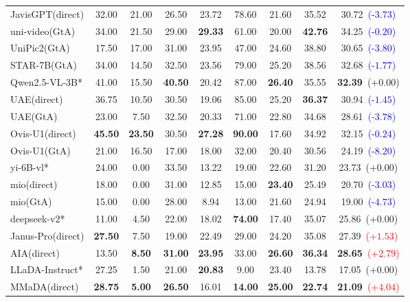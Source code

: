 \documentclass{article}
\theoremstyle{plain}
\theoremstyle{definition}
\theoremstyle{remark}
\begin{document}
\begin{table}[t]
{\begin{tabular}{@{}lcccccccc@{}}
JavisGPT(direct) & 32.00 & 21.00 & 26.50 & 23.72 & 78.60 & 21.60 & 35.52 & 30.72~\textcolor{blue}{(-$3.73$)} \\
uni-video(GtA) & 34.00 & 21.50 & 29.00 & \textbf{29.33} & 61.00 & 20.00 & \textbf{42.76} & 34.25~\textcolor{blue}{(-$0.20$)} \\
UniPic2(GtA) & 17.50 & 17.00 & 31.00 & 23.95 & 47.00 & 24.60 & 38.80 & 30.65~\textcolor{blue}{(-$3.80$)} \\
STAR-7B(GtA) & 34.00 & 14.50 & 32.50 & 23.56 & 79.00 & 25.20 & 38.56 & 32.68~\textcolor{blue}{(-$1.77$)} \\
\midrule
\rowcolor{gray!12}
Qwen2.5-VL-3B* & 41.00 & 15.50 & \textbf{40.50} & 20.42 & 87.00 & \textbf{26.40} & 35.55 & \textbf{32.39}~(+$0.00$) \\
UAE(direct) & 36.75 & 10.50 & 30.50 & 19.06 & 85.00 & 25.20 & \textbf{36.37} & 30.94~\textcolor{blue}{(-$1.45$)} \\
UAE(GtA) & 23.00 & 7.50 & 32.50 & 20.33 & 71.00 & 22.80 & 34.68 & 28.61~\textcolor{blue}{(-$3.78$)} \\
Ovis-U1(direct) & \textbf{45.50} & \textbf{23.50} & 30.50 & \textbf{27.28} & \textbf{90.00} & 17.60 & 34.92 & 32.15~\textcolor{blue}{(-$0.24$)} \\
Ovis-U1(GtA) & 21.00 & 16.50 & 17.00 & 18.00 & 32.00 & 20.40 & 30.56 & 24.19~\textcolor{blue}{(-$8.20$)} \\
\midrule
\rowcolor{gray!12}
yi-6B-vl* & 24.00 & 0.00 & 33.50 & 13.22 & 19.00 & 22.60 & 31.20 & 23.73~(+$0.00$) \\
mio(direct) & 18.00 & 0.00 & 31.00 & 12.85 & 15.00 & \textbf{23.40} & 25.49 & 20.70~\textcolor{blue}{(-$3.03$)} \\
mio(GtA) & 15.00 & 0.00 & 28.00 & 8.94 & 13.00 & 21.60 & 24.94 & 19.00~\textcolor{blue}{(-$4.73$)} \\
\midrule
\rowcolor{gray!12}
deepseek-v2* & 11.00 & 4.50 & 22.00 & 18.02 & \textbf{74.00} & 17.40 & 35.07 & 25.86~(+$0.00$) \\
Janus-Pro(direct) & \textbf{27.50} & 7.50 & 19.00 & 22.49 & 29.00 & 24.20 & 35.08 & 27.39~\textcolor{red}{(+$1.53$)} \\
AIA(direct) & 13.50 & \textbf{8.50} & \textbf{31.00} & \textbf{23.95} & 33.00 & \textbf{26.60} & \textbf{36.34} & \textbf{28.65}~\textcolor{red}{(+$2.79$)} \\
\midrule
\rowcolor{gray!12}
LLaDA-Instruct* & 27.25 & 1.50 & 21.00 & \textbf{20.83} & 9.00 & 23.40 & 13.78 & 17.05~(+$0.00$) \\
MMaDA(direct) & \textbf{28.75} & \textbf{5.00} & \textbf{26.50} & 16.01 & \textbf{14.00} & \textbf{25.00} & \textbf{22.74} & \textbf{21.09}~\textcolor{red}{(+$4.04$)} \\

\end{tabular}}
\end{table}
\end{document}
